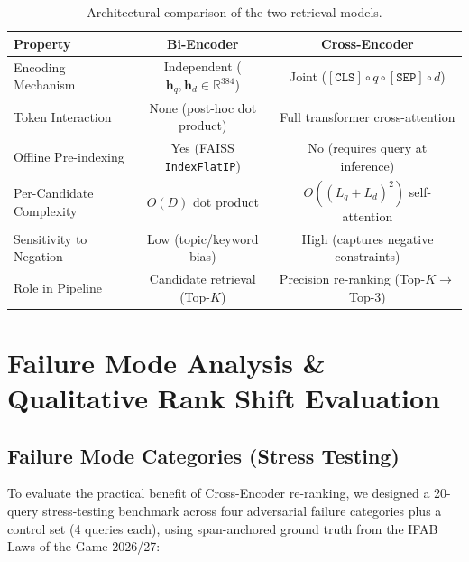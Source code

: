 \documentclass[11pt,a4paper]{article}
\begin{document}
\begin{table}[H]
\centering
\small
\caption{Architectural comparison of the two retrieval models.}
\label{tab:arch}
\begin{tabular}{@{}lcc@{}}
\toprule
\textbf{Property} & \textbf{Bi-Encoder} & \textbf{Cross-Encoder} \\
\midrule
Encoding Mechanism       & Independent ($\mathbf{h}_q, \mathbf{h}_d \in \mathbb{R}^{384}$) & Joint ($[\texttt{CLS}] \circ q \circ [\texttt{SEP}] \circ d$) \\
Token Interaction        & None (post-hoc dot product) & Full transformer cross-attention \\
Offline Pre-indexing     & Yes (FAISS \texttt{IndexFlatIP}) & No (requires query at inference) \\
Per-Candidate Complexity & $O(D)$ dot product & $O((L_q + L_d)^2)$ self-attention \\
Sensitivity to Negation  & Low (topic/keyword bias) & High (captures negative constraints) \\
Role in Pipeline         & Candidate retrieval (Top-$K$) & Precision re-ranking (Top-$K \to$ Top-3) \\
\bottomrule
\end{tabular}
\end{table}


\section{Failure Mode Analysis \& Qualitative Rank Shift Evaluation}
\label{sec:qualitative}

\subsection{Failure Mode Categories (Stress Testing)}

To evaluate the practical benefit of Cross-Encoder re-ranking, we designed a 20-query stress-testing benchmark across four adversarial failure categories plus a control set (4 queries each), using span-anchored ground truth from the IFAB Laws of the Game 2026/27:
\end{document}
